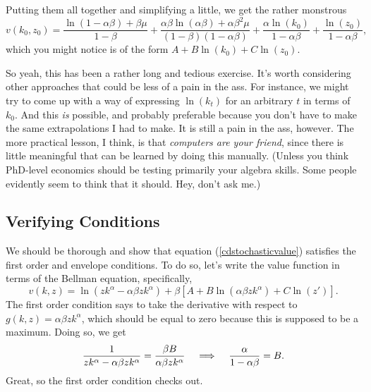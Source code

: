 \documentclass[12pt]{article}
\newcommand{\Lindent}{\hspace{.4cm} \Longrightarrow \hspace{.4cm}}
\theoremstyle{definition}
\begin{document}
Putting them all together and simplifying a little, we get the rather monstrous
\begin{equation}
	v(k_0,z_0) =  \frac{\ln(1 - \alpha \beta) + \beta \mu}{1 - \beta} + \frac{\alpha \beta \ln(\alpha \beta)+\alpha \beta^2 \mu}{(1 - \beta)(1 - \alpha \beta)} + \frac{\alpha \ln(k_0)}{1 - \alpha \beta} + \frac{\ln(z_0)}{1 - \alpha \beta}, \label{cdstochasticvalue}
\end{equation}
which you might notice is of the form $A + B\ln(k_0) + C\ln(z_0)$.

So yeah, this has been a rather long and tedious exercise. It's worth considering other approaches that could be less of a pain in the ass. For instance, we might try to come up with a way of expressing $\ln(k_t)$ for an arbitrary $t$ in terms of $k_0$. And this \emph{is} possible, and probably preferable because you don't have to make the same extrapolations I had to make. It is still a pain in the ass, however. The more practical lesson, I think, is that \emph{computers are your friend}, since there is little meaningful that can be learned by doing this manually. (Unless you think PhD-level economics should be testing primarily your algebra skills. Some people evidently seem to think that it should. Hey, don't ask me.)


\subsection{Verifying Conditions}

We should be thorough and show that equation (\ref{cdstochasticvalue}) satisfies the first order and envelope conditions. To do so, let's write the value function in terms of the Bellman equation, specifically,
	\[v(k,z)=\ln(z k^{\alpha} - \alpha \beta zk^{\alpha})  + \beta[A + B\ln(\alpha \beta zk^{\alpha}) + C\ln(z')]. \]
The first order condition says to take the derivative with respect to $g(k,z)=\alpha \beta zk^{\alpha}$, which should be equal to zero because this is supposed to be a maximum. Doing so, we get
	\[	\frac{1}{z k^{\alpha} - \alpha \beta zk^{\alpha}} = \frac{\beta B}{\alpha \beta zk^{\alpha}} \Lindent \frac{\alpha}{ 1- \alpha \beta } = B. \]
Great, so the first order condition checks out.
\end{document}
